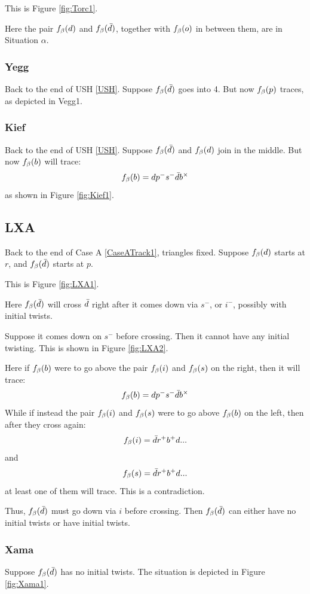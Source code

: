 This is Figure \ref{fig:Torc1}.

Here the pair $f_\beta(d)$ and $f_\beta(\bar{d})$, together with $f_\beta(o)$ in between them, are in Situation $\alpha$.

\subsubsection{Yegg}
Back to the end of USH \ref{USH}. Suppose $f_\beta(\bar{d})$ goes into 4. But now $f_\beta(p)$ traces, as depicted in Vegg1.

\subsubsection{Kief}\label{Kief}
Back to the end of USH \ref{USH}. Suppose $f_\beta(\bar{d})$ and $f_\beta(d)$ join in the middle. But now $f_\beta(b)$ will trace:
\[
f_\beta(b) = d p^- s^- \bar{d} b^\times
\]
as shown in Figure \ref{fig:Kief1}.

\subsection{LXA}\label{LXA}
Back to the end of Case A \ref{CaseATrack1}, triangles fixed. Suppose $f_\beta(d)$ starts at $r$, and $f_\beta(\bar{d})$ starts at $p$.

This is Figure \ref{fig:LXA1}.

Here $f_\beta(\bar{d})$ will cross $\bar{d}$ right after it comes down via $s^-$, or $i^-$, possibly with initial twists. 

Suppose it comes down on $s^-$ before crossing. Then it cannot have any initial twisting. This is shown in Figure \ref{fig:LXA2}.

Here if $f_\beta(b)$ were to go above the pair $f_\beta(i)$ and $f_\beta(s)$ on the right, then it will trace:
\[
f_\beta(b) = d p^- s^- \bar{d} b^\times
\]
While if instead the pair $f_\beta(i)$ and $f_\beta(s)$ were to go above $f_\beta(b)$ on the left, then after they cross again:
\[
f_\beta(i) = \bar{d} r^+ b^+ d...
\]
and 
\[
f_\beta(s) = \bar{d} r^+ b^+ d...
\]
at least one of them will trace. This is a contradiction.

Thus, $f_\beta(\bar{d})$ must go down via $i$ before crossing. Then $f_\beta(\bar{d})$ can either have no initial twists or have initial twists.

\subsubsection{Xama}\label{Xama}
Suppose $f_\beta(\bar{d})$ has no initial twists. The situation is depicted in Figure \ref{fig:Xama1}.

